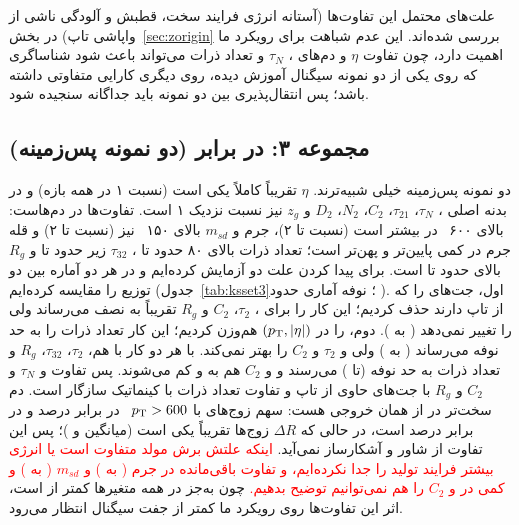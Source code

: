 علت‌های محتمل این تفاوت‌ها (آستانه انرژی فرایند سخت، قطبش \Zbos{} و آلودگی ناشی از واپاشی تاپ) در بخش~\ref{sec:zorigin} بررسی شده‌اند. این عدم شباهت برای رویکرد ما اهمیت دارد، چون تفاوت $\eta$ و دم‌های ، $\tau_N$ و تعداد ذرات می‌تواند باعث شود شناساگری که روی یکی از دو نمونه سیگنال آموزش دیده، روی دیگری کارایی متفاوتی داشته باشد؛ پس انتقال‌پذیری بین دو نمونه باید جداگانه سنجیده شود.

\subsection{مجموعه ۳: {\boldmath\ttbb} در برابر {\boldmath\bbbb} (دو نمونه پس‌زمینه)}
\label{sec:set3}
دو نمونه پس‌زمینه خیلی شبیه‌ترند. $\eta$ تقریباً کاملاً یکی است (نسبت ۱ در همه بازه) و در بدنه اصلی ، $\tau_N$، $\tau_{21}$، $C_2$، $N_2$، $D_2$ و $z_g$ نیز نسبت نزدیک ۱ است. تفاوت‌ها در دم‌هاست: \pt بالای ۶۰۰~ در \ttbb بیشتر است (نسبت  تا ۲)، جرم و $m_{sd}$ بالای ۱۵۰~ نیز (نسبت  تا ۲) و قله جرم در \ttbb کمی پایین‌تر و پهن‌تر است؛ تعداد ذرات بالای ۸۰ حدود  تا ، $\tau_{32}$ زیر  حدود  تا  و $R_g$ بالای  حدود  تا  است. برای پیدا کردن علت دو آزمایش کرده‌ایم و در هر دو آماره  بین دو توزیع را مقایسه کرده‌ایم (جدول~\ref{tab:ksset3}؛ نوفه آماری حدود ). اول، جت‌های \ttbb را که \bq{} از تاپ دارند حذف کردیم؛ این کار  را برای ، $\tau_2$، $C_2$ و $R_g$ تقریباً به نصف می‌رساند ولی \pt را تغییر نمی‌دهد ( به ). دوم، \bbbb را در $(p_\mathrm{T},|\eta|)$ هم‌وزن \ttbb کردیم؛ این کار تعداد ذرات را به حد نوفه می‌رساند ( به ) ولی  و $\tau_2$ و $C_2$ را بهتر نمی‌کند. با هر دو کار با هم، $\tau_2$، $\tau_{32}$، $R_g$ و تعداد ذرات به حد نوفه (تا ) می‌رسند و  و $C_2$ هم به  و  کم می‌شوند. پس تفاوت  و $\tau_N$ و $C_2$ و $R_g$ با جت‌های حاوی \bq{} از تاپ و تفاوت تعداد ذرات با کینماتیک سازگار است. دم سخت‌تر \pt در \ttbb از همان خروجی  هست: سهم زوج‌های \bq{} با $p_\mathrm{T}>600$~ در \ttbb برابر  درصد و در \bbbb برابر  درصد است، در حالی که $\Delta R$ زوج‌ها تقریباً یکی است (میانگین  و )؛ پس این تفاوت از شاور و آشکارساز نمی‌آید. \textcolor{red}{اینکه علتش برش مولد متفاوت است یا انرژی بیشتر فرایند تولید \ttbb را جدا نکرده‌ایم، و تفاوت باقی‌مانده در جرم ( به ) و $m_{sd}$ ( به ) و کمی در  و $C_2$ را هم نمی‌توانیم توضیح بدهیم.} چون به‌جز \pt در همه متغیرها  کمتر از  است، اثر این تفاوت‌ها روی رویکرد ما کمتر از جفت سیگنال انتظار می‌رود.

